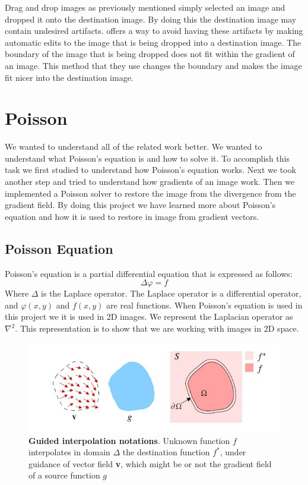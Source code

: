 \documentclass[10pt,twopage]{acmsiggraph}
\begin{document}
Drag and drop images as previously mentioned simply selected an image and dropped it onto the destination image. By doing this the destination image may contain undesired artifacts.\cite{ddp} offers a way to avoid having these artifacts by making automatic edits to the image that is being dropped into a destination image. The boundary of the image that is being dropped does not fit within the gradient of an image. This method that they use changes the boundary and makes the image fit nicer into the destination image.

\section{Poisson}

We wanted to understand all of the related work better. We wanted to understand what Poisson's equation is and how to solve it. To accomplish this task we first studied to understand how Poisson's equation works. Next we took another step and tried to understand how gradients of an image work. Then we implemented a Poisson solver to restore the image from the divergence from the gradient field. By doing this project we have learned more about Poisson's equation and how it is used to restore in image from gradient vectors.

\subsection{Poisson Equation}
\label{Poisson}
Poisson's equation is a partial differential equation that is expressed as follows:
\begin{equation} 
\ensuremath{\Delta \varphi = f}
\end{equation}
 Where \ensuremath{\Delta} is the Laplace operator. The Laplace operator is a differential operator, and \ensuremath{ \varphi(x,y) } and $ f(x,y) $ are real functions. When Poisson's equation is used in this project we it is used in 2D images. We represent the Laplacian operator as \ensuremath{\nabla^2}. This representation is to show that we are working with images in 2D space.

\begin{figure}
\centering
\includegraphics[width=.44\textwidth]{fig/notations.jpg}
\caption{{\bf Guided interpolation notations}. Unknown function $f$ interpolates in domain \ensuremath{\Delta} the destination function $f^*$, under guidance of vector field {\bf v}, which might be or not the gradient field of a source function $g$}
\label{notations}
\end{figure}
\end{document}
